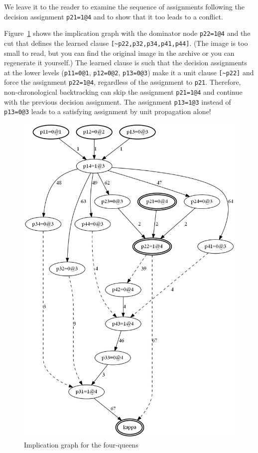 \documentclass[11pt]{report}
\newcommand*{\p}[1]{\textup{\texttt{#1}}}
\begin{document}
We leave it to the reader to examine the sequence of assignments
following the decision assignment \p{p21=1@4} and to show that it too
leads to a conflict.

Figure~\ref{queens-ig} shows the implication graph with the dominator
node \verb+p22=1@4+ and the cut that defines the learned clause
\verb+[~p22,p32,p34,p41,p44]+. (The image is too small to read, but you
can find the original image in the archive or you can regenerate it
yourself.) The learned clause is such that the decision assignments at
the lower levels (\verb+p11=0@1+, \verb+p12=0@2+, \verb+p13=0@3+) make
it a unit clause \verb+[~p22]+ and force the assignment \p{p22=1@4},
regardless of the assignment to \p{p21}. Therefore, non-chronological
backtracking can skip the assignment \p{p21=1@4} and continue with the
previous decision assignment. The assignment \p{p13=1@3} instead of
\p{p13=0@3} leads to a satisfying assignment by unit propagation alone!
 
\begin{figure}[b]
\begin{center}
\includegraphics[keepaspectratio=true,height=.9\textheight]{queens-bw}
\end{center}
\caption{Implication graph for the four-queens}\label{queens-ig}
\end{figure}
\end{document}
